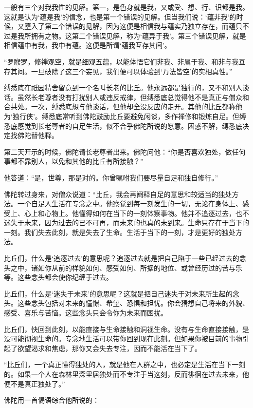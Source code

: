 \documentclass[12pt,twoside,openany]{book}
\begin{document}
一般有三个对我我性的见解。第一，是色身就是我，又或受、想、行、识都是我。这就是认为‘蕴是我’的信念，也是第一个错误的见解。但当我们说：‘蕴非我’的时候，又堕入了第二个错误的见解，因为这便是相信我与蕴实乃独立存在，而蕴只不过是我所拥有之物。这第二个错误见解，称为‘蕴异于我’。第三个错误见解，就是相信蕴中有我，我中有蕴。这便是所谓‘蕴我互存其间’。

“罗睺罗，修禅观空，就是细观五蕴，以能体悟它们非我、非属于我、和非与我互存其间。一旦破除了这三个妄见，我们便可以体验到‘万法皆空’的实相真性。”

缚悉底在祇园精舍留意到一个名叫长老的比丘。他永远都是独行的，又不和别人谈话。虽然长老尊者没有打扰别人或违反戒律，但缚悉底总觉得他不是真正与僧众和合共处。一次，缚悉底想与他谈话，但他却全没反应的走开。其他的比丘都称他为‘独行侠’。缚悉底常听到佛陀鼓励比丘要避免闲谈，多作禅修和锻炼自足。但缚悉底感觉到长老尊者的自足生活，似不合乎佛陀所说的愿意。困惑不解，缚悉底决定找佛陀替他释。

第二天开示的时候，佛陀请长老尊者出来。佛陀问他：“你是否喜欢独处，做任何事都不靠别人，以免和其他的比丘有所接触？”

他答道：“是，世尊，那是对的。你曾嘱咐我们要尽量自足和独自修行。”

佛陀转过身来，对僧众说道：“比丘，我会再阐释自足的意思和较适当的独处方法。一个自足人生活在专念之中。他察觉到每一刻发生的一切，无论在身体上、感受上、心上和心物上。他懂得如何在当下的一刻体察事物。他并不追逐过去，也不迷失于未来，因为过去的已不可再，而未来的也真的未到来。生命只存在于当下的一刻。我们失去此刻，就是失去了生命。生活于当下的一刻，才是更好的独处方法。

比丘们，什么是‘追逐过去’的意思呢？追逐过去就是把自己陷于一些已经过去的念头之中，诸如你从前的样貌如何、感受如何、所据的地位、或曾经历过的苦与乐等。这些念头都会使你纪缠于过去。

比丘们，什么是‘迷失于未来’的意思呢？这就是把自己迷失于对未来所生起的念头。这些念头包括对未来的憧憬、希望、恐惧和担忧。你会猜想自己将来的外貌、感受、喜乐与苦恼。这些念头只会令你为未来而困扰。

比丘们，快回到此刻，以能直接与生命接触和洞视生命。没有与生命直接接触，是没可能彻视生命的。专念地生活可以带你回到现在此刻。但如果你被目前的事物引起了欲望渴求和焦虑，那你又会失去专注，因而不能活在当下了。

“比丘们，一个真正懂得独处的人，就是他在人群之中，也必定是生活在当下一刻的。如果一个人在森林里深里居独处而不专注于当这刻，反而徘徊在过去未来，他便不是真正独处了。”

佛陀用一首偈语综合他所说的：
\end{document}
